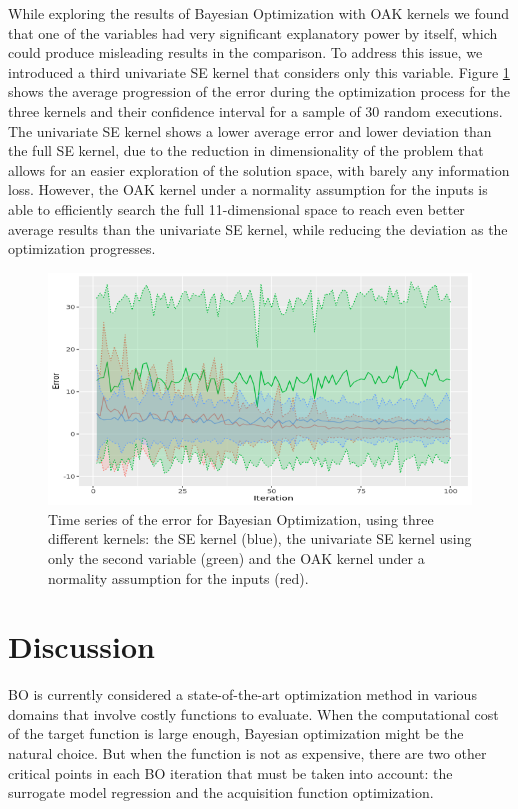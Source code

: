 \documentclass{IOS-Book-Article}
\begin{document}
	While exploring the results of Bayesian Optimization with OAK kernels we found that one of the variables had very significant explanatory power by itself, which could produce misleading results in the comparison. To address this issue, we introduced a third univariate SE kernel that considers only this variable. Figure \ref{fig:results_oak} shows the average progression of the error during the optimization process for the three kernels and their confidence interval for a sample of 30 random executions. The univariate SE kernel shows a lower average error and lower deviation than the full SE kernel, due to the reduction in dimensionality of the problem that allows for an easier exploration of the solution space, with barely any information loss. However, the OAK kernel under a normality assumption for the inputs is able to efficiently search the full 11-dimensional space to reach even better average results than the univariate SE kernel, while reducing the deviation as the optimization progresses.
	
	\begin{figure}[h!]
		\centering	
		\includegraphics[width=\textwidth]{figs/results.png}		
		\caption{Time series of the error for Bayesian Optimization, using three different kernels: the SE kernel (blue), the univariate SE kernel using only the second variable (green) and the OAK kernel under a normality assumption for the inputs (red).}
		\label{fig:results_oak}	
	\end{figure}
	
	\section{Discussion}
	BO is currently considered a state-of-the-art optimization method in various domains that involve costly functions to evaluate. When the computational cost of the target function is large enough, Bayesian optimization might be the natural choice. But when the function is not as expensive, there are two other critical points in each BO iteration that must be taken into account: the surrogate model regression and the acquisition function optimization.
	
\end{document}
